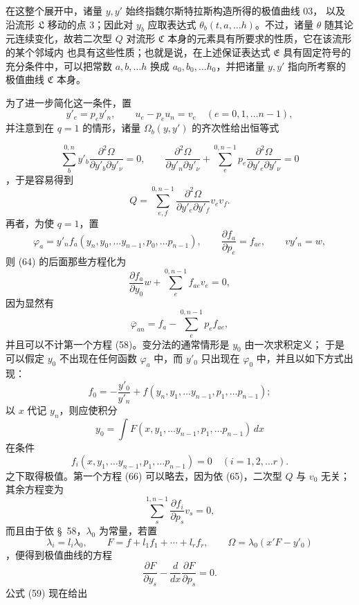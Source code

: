 \documentclass[11pt,a4paper,leqno]{article}
\begin{document}
在这整个展开中，诸量 $y,y'$ 始终指魏尔斯特拉斯构造所得的极值曲线 03，
以及沿流形 $\mathfrak{L}$ 移动的点 3；因此对 $y_b$ 应取表达式
$\theta_b(t,a,\ldots h)$。不过，诸量 $\theta$ 随其论元连续变化，故若二次型
$Q$ 对流形 $\mathfrak{C}$ 本身的元素具有所要求的性质，它在该流形的某个邻域内
也具有这些性质；也就是说，在上述保证表达式 $\mathfrak{E}$ 具有固定符号的
充分条件中，可以把常数 $a,b,\ldots h$ 换成 $a_0,b_0,\ldots h_0$，并把诸量
$y,y'$ 指向所考察的极值曲线 $\mathfrak{C}$ 本身。

为了进一步简化这一条件，置
\[
y'_e=p_e y'_n,\qquad u_e-p_eu_n=v_e
\quad(e=0,1,\ldots n-1),
\]
并注意到在 $q=1$ 的情形，诸量 $\Omega_b(y,y')$ 的齐次性给出恒等式

\[
\sum_b^{0,n}y'_b
\frac{\partial^2\Omega}{\partial y'_b\partial y'_\nu}=0,\qquad
\frac{\partial^2\Omega}{\partial y'_n\partial y'_\nu}
+\sum_e^{0,n-1}p_e
\frac{\partial^2\Omega}{\partial y'_e\partial y'_\nu}=0
\]
，于是容易得到
\begin{equation}\tag{65}
Q=\sum_{e,f}^{0,n-1}
\frac{\partial^2\Omega}{\partial y'_e\partial y'_f}v_ev_f.
\end{equation}
再者，为使 $q=1$，置
\[
\varphi_a=y'_n f_a(y_n,y_0,\ldots y_{n-1},p_0,\ldots p_{n-1}),\qquad
\frac{\partial f_a}{\partial p_e}=f_{ae},\qquad vy'_n=w,
\]
则 (64) 的后面那些方程化为
\begin{equation}\tag{66}
\frac{\partial f_a}{\partial y_0}w
+\sum_e^{0,n-1}f_{ae}v_e=0,
\end{equation}
因为显然有
\[
\overline{\varphi}_{an}=f_a-\sum_e^{0,n-1}p_e f_{ae},
\]
并且可以不计第一个方程 (58)。变分法的通常情形是 $y_0$ 由一次求积定义；
于是可以假定 $y_0$ 不出现在任何函数 $\varphi_a$ 中，而 $y'_0$ 只出现在
$\varphi_0$ 中，并且以如下方式出现：
\[
f_0=-\frac{y'_0}{y'_n}
+f(y_n,y_1,\ldots y_{n-1},p_1,\ldots p_{n-1});
\]
以 $x$ 代记 $y_n$，则应使积分
\[
y_0=\int F(x,y_1,\ldots y_{n-1},p_1,\ldots p_{n-1})\,dx
\]
在条件
\[
f_i(x,y_1,\ldots y_{n-1},p_1,\ldots p_{n-1})=0
\quad(i=1,2,\ldots r).
\]
之下取得极值。第一个方程 (66) 可以略去，因为依 (65)，二次型 $Q$ 与
$v_0$ 无关；其余方程变为
\begin{equation}\tag{67}
\sum_s^{1,n-1}\frac{\partial f_i}{\partial p_s}v_s=0,
\end{equation}
而且由于依 \S~58，$\lambda_0$ 为常量，若置
\[
\lambda_i=l_i\lambda_0,\qquad
F=f+l_1f_1+\cdots+l_rf_r,\qquad
\Omega=\lambda_0(x'F-y'_0)
\]
，便得到极值曲线的方程
\[
\frac{\partial F}{\partial y_s}
-\frac{d}{dx}\frac{\partial F}{\partial p_s}=0.
\]
公式 (59) 现在给出
\end{document}
